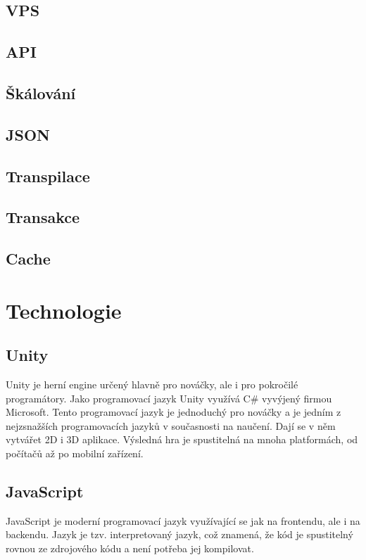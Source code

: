 \subsection{VPS}

\subsection{API}

\subsection{Škálování}

\subsection{JSON}

\subsection{Transpilace}

\subsection{Transakce}

\subsection{Cache}

\section{Technologie}

\subsection{Unity}
Unity je herní engine určený hlavně pro nováčky, ale i pro pokročilé programátory. Jako programovací jazyk Unity využívá C\# vyvýjený firmou Microsoft. Tento programovací jazyk je jednoduchý pro nováčky a je jedním z nejzsnažších programovacích jazyků v současnosti na naučení. \cite{Csharp} Dají se v něm vytvářet 2D i 3D aplikace. Výsledná hra je spustitelná na mnoha platformách, od počítačů až po mobilní zařízení.

\subsection{JavaScript}
JavaScript je moderní programovací jazyk využívající se jak na frontendu, ale i na backendu. Jazyk je tzv. interpretovaný jazyk, což znamená, že kód je spustitelný rovnou ze zdrojového kódu a není potřeba jej kompilovat.


